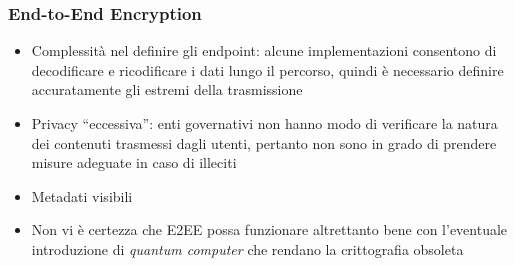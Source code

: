 \begin{frame}
    \frametitle{End-to-End Encryption} 
    \begin{itemize}
        \item Complessità nel definire gli endpoint: alcune implementazioni consentono di decodificare e ricodificare i dati lungo il percorso, quindi è necessario definire accuratamente gli estremi della trasmissione\pause
        \item Privacy ``eccessiva'': enti governativi non hanno modo di verificare la natura dei contenuti trasmessi dagli utenti, pertanto non sono in grado di prendere misure adeguate in caso di illeciti\pause
        \item Metadati visibili\pause
        \item Non vi è certezza che E2EE possa funzionare altrettanto bene con l'eventuale introduzione di \textit{quantum computer} che rendano la crittografia obsoleta
    \end{itemize}
    \cite{techTarget}
\end{frame}